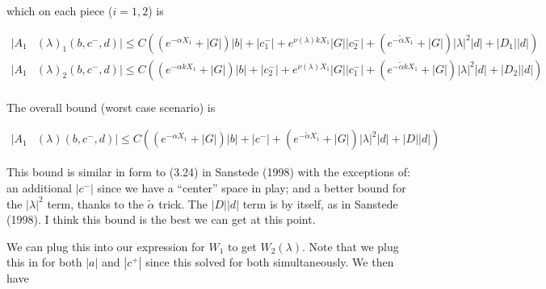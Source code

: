 \documentclass[12pt]{article}
\begin{document}
\begin{enumerate}
which on each piece ($i = 1, 2$) is

\begin{align*}
|A_1&(\lambda)_1(b, c^-, d)| \leq C ((e^{-\alpha X_1} + |G|) |b| + |c_1^-| + e^{\nu(\lambda)k X_1} |G||c_2^-| + (e^{-\tilde{\alpha} X_1} + |G|) |\lambda|^2 |d| + |D_1||d| ) \\
|A_1&(\lambda)_2(b, c^-, d)| \leq C ((e^{-\alpha k X_1} + |G|) |b| + |c_2^-| + e^{\nu(\lambda) X_1} |G||c_1^-| + (e^{-\tilde{\alpha} k X_1} + |G|) |\lambda|^2 |d| + |D_2||d| ) \\
\end{align*}

The overall bound (worst case scenario) is 

\begin{align*}
|A_1&(\lambda)(b, c^-, d)| \leq C( (e^{-\alpha X_1} + |G|) |b| + |c^-| + (e^{-\tilde{\alpha} X_1} + |G|) |\lambda|^2 |d| + |D| |d| )
\end{align*}

This bound is similar in form to (3.24) in Sanstede (1998) with the exceptions of: an additional $|c^-|$ since we have a ``center'' space in play; and a better bound for the $|\lambda|^2$ term, thanks to the $\tilde{\alpha}$ trick. The $|D| |d| $ term is by itself, as in Sanstede (1998). I think this bound is the best we can get at this point.

We can plug this into our expression for $W_1$ to get $W_2(\lambda)$. Note that we plug this in for both $|a|$ and $|c^+|$ since this solved for both simultaneously. We then have


\end{enumerate}
\end{document}

